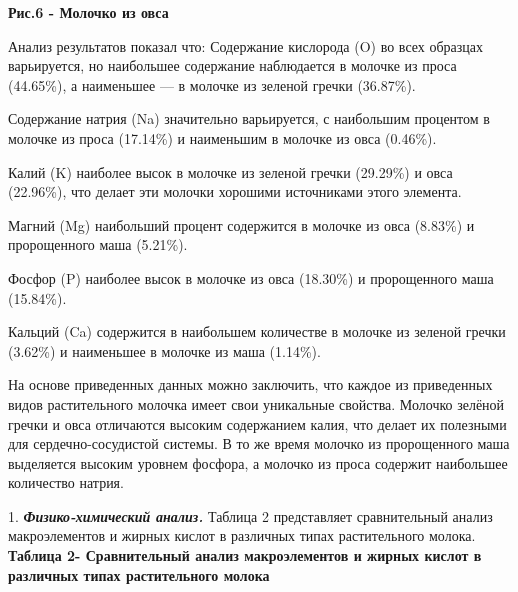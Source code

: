 
{\bfseries Рис.6 - Молочко из овса}

Анализ результатов показал что: Содержание кислорода (O) во всех
образцах варьируется, но наибольшее содержание наблюдается в молочке из
проса (44.65\%), а наименьшее --- в молочке из зеленой гречки (36.87\%).

Содержание натрия (Na) значительно варьируется, с наибольшим процентом в
молочке из проса (17.14\%) и наименьшим в молочке из овса (0.46\%).

Калий (K) наиболее высок в молочке из зеленой гречки (29.29\%) и овса
(22.96\%), что делает эти молочки хорошими источниками этого элемента.

Магний (Mg) наибольший процент содержится в молочке из овса (8.83\%) и
пророщенного маша (5.21\%).

Фосфор (P) наиболее высок в молочке из овса (18.30\%) и пророщенного
маша (15.84\%).

Кальций (Ca) содержится в наибольшем количестве в молочке из зеленой
гречки (3.62\%) и наименьшее в молочке из маша (1.14\%).

На основе приведенных данных можно заключить, что каждое из приведенных
видов растительного молочка имеет свои уникальные свойства. Молочко
зелёной гречки и овса отличаются высоким содержанием калия, что делает
их полезными для сердечно-сосудистой системы. В то же время молочко из
пророщенного маша выделяется высоким уровнем фосфора, а молочко из проса
содержит наибольшее количество натрия.

\setcounter{enumi}{1}

1. \emph{{\bfseries Физико-химический анализ.}} Таблица 2 представляет
сравнительный анализ макроэлементов и жирных кислот в различных типах
растительного молока.
{\bfseries Таблица 2- Сравнительный анализ макроэлементов и жирных кислот в
различных типах растительного молока}

